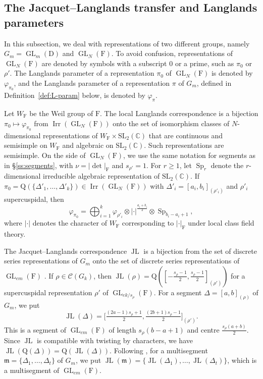 \documentclass[11pt]{amsart}
\numberwithin{equation}{section}
\theoremstyle{plain}
\theoremstyle{definition}
\theoremstyle{remark}
\newcommand{\C}{\mathbb{C}}
\DeclareMathOperator{\GL}{GL}
\DeclareMathOperator{\Irr}{Irr}
\DeclareMathOperator{\Sp}{Sp}
\DeclareMathOperator{\JL}{JL}
\newcommand{\mm}{\mathfrak{m}}
\newcommand{\Qq}{\mathrm{Q}}
\begin{document}
\subsection{The Jacquet--Langlands transfer and Langlands parameters}\label{ss:JL}

In this subsection, we deal with representations of two different groups, namely $G_m=\GL_m(\mathrm{D})$ and $\GL_N(\mathrm{F})$. To avoid confusion, representations of $\GL_N(\mathrm{F})$ are denoted by symbols with a subscript $0$ or a prime, such as $\pi_0$ or $\rho'$. The Langlands parameter of a representation $\pi_0$ of $\GL_N(\mathrm{F})$ is denoted by $\varphi_{\pi_0}$, and the Langlands parameter of a representation $\pi$ of $G_m$, defined in Definition~\ref{def:L-param} below, is denoted by $\varphi_\pi$.

 Let $W_{\mathrm{F}}$ be the Weil group of $\mathrm{F}$. The local Langlands correspondence \cite{HT01,Hen00,Sch13} is a bijection $\pi_0\mapsto\varphi_{\pi_0}$ from $\Irr(\GL_N(\mathrm{F}))$ onto the set of isomorphism classes of $N$-dimensional representations of $W_{\mathrm{F}}\times\mathrm{SL}_2(\C)$ that are continuous and semisimple on $W_{\mathrm{F}}$ and algebraic on $\mathrm{SL}_2(\C)$. Such representations are semisimple. On the side of $\GL_N(\mathrm{F})$, we use the same notation for segments as in \S\ref{ss:segments}, with $\nu=|\det|_{\mathrm{F}}$ and $s_{\rho'}=1$. For $r\ge1$, let $\Sp_r$ denote the $r$-dimensional irreducible algebraic representation of $\mathrm{SL}_2(\C)$. If $\pi_0=\Qq(\{\Delta'_1,\dots,\Delta'_k\})\in\Irr(\GL_N(\mathrm{F}))$ with $\Delta'_i=[a_i,b_i]_{(\rho'_i)}$ and $\rho'_i$ supercuspidal, then
\begin{equation}\label{eq:LLC-formula}
	\varphi_{\pi_0}=\bigoplus_{i=1}^k\varphi_{\rho'_i}\otimes|\cdot|^{\frac{a_i+b_i}2}\otimes\Sp_{b_i-a_i+1},
\end{equation}
where $|\cdot|$ denotes the character of $W_{\mathrm{F}}$ corresponding to $|\cdot|_{\mathrm{F}}$ under local class field theory.

The Jacquet--Langlands correspondence $\JL$ is a bijection from the set of discrete series representations of $G_m$ onto the set of discrete series representations of $\GL_{em}(\mathrm{F})$ \cite{DKV84}. If $\rho\in\mathcal C(G_k)$, then $\JL(\rho)=\Qq([-\frac{s_\rho-1}2,\frac{s_\rho-1}2]_{(\rho')})$ for a supercuspidal representation $\rho'$ of $\GL_{ek/s_\rho}(\mathrm{F})$. For a segment $\Delta=[a,b]_{(\rho)}$ of $G_m$, we put
$$
\JL(\Delta)=\Big[\tfrac{(2a-1)s_\rho+1}2,\tfrac{(2b+1)s_\rho-1}2\Big]_{(\rho')}.
$$
This is a segment of $\GL_{em}(\mathrm{F})$ of length $s_\rho(b-a+1)$ and centre $\frac{s_\rho(a+b)}2$. Since $\JL$ is compatible with twisting by characters, we have $\JL(\Qq(\Delta))=\Qq(\JL(\Delta))$. Following \cite[\S2]{ALMSY24}, for a multisegment $\mm=\{\Delta_1,\dots,\Delta_t\}$ of $G_m$, we put $\JL(\mm)=\{\JL(\Delta_1),\dots,\JL(\Delta_t)\}$, which is a multisegment of $\GL_{em}(\mathrm{F})$.
\end{document}
